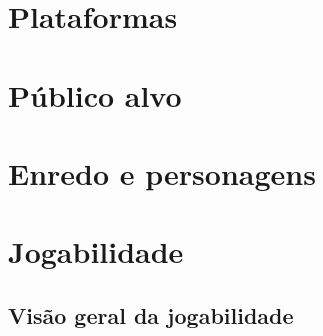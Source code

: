 \documentclass[12pt,a4paper]{article}
\begin{document}

\section{Plataformas}


\section{Público alvo}


\section{Enredo e personagens}






\section{Jogabilidade}

\subsection{Visão geral da jogabilidade}
\end{document}
